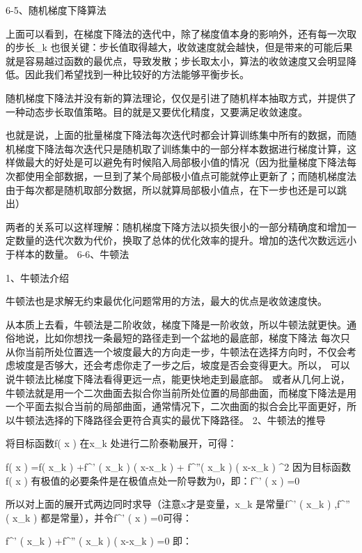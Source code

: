 \documentclass[11pt]{book}
\newcounter{#2}
\newcounter{#2}[#1]
\numberwithin{#2}{#1}
\begin{document}
6-5、随机梯度下降算法

上面可以看到，在梯度下降法的迭代中，除了梯度值本身的影响外，还有每一次取的步长\lambda _{k} 也很关键：步长值取得越大，收敛速度就会越快，但是带来的可能后果就是容易越过函数的最优点，导致发散；步长取太小，算法的收敛速度又会明显降低。因此我们希望找到一种比较好的方法能够平衡步长。

随机梯度下降法并没有新的算法理论，仅仅是引进了随机样本抽取方式，并提供了一种动态步长取值策略。目的就是又要优化精度，又要满足收敛速度。

也就是说，上面的批量梯度下降法每次迭代时都会计算训练集中所有的数据，而随机梯度下降法每次迭代只是随机取了训练集中的一部分样本数据进行梯度计算，这样做最大的好处是可以避免有时候陷入局部极小值的情况（因为批量梯度下降法每次都使用全部数据，一旦到了某个局部极小值点可能就停止更新了；而随机梯度法由于每次都是随机取部分数据，所以就算局部极小值点，在下一步也还是可以跳出）

两者的关系可以这样理解：随机梯度下降方法以损失很小的一部分精确度和增加一定数量的迭代次数为代价，换取了总体的优化效率的提升。增加的迭代次数远远小于样本的数量。
6-6、牛顿法

1、牛顿法介绍

牛顿法也是求解无约束最优化问题常用的方法，最大的优点是收敛速度快。

从本质上去看，牛顿法是二阶收敛，梯度下降是一阶收敛，所以牛顿法就更快。通俗地说，比如你想找一条最短的路径走到一个盆地的最底部，梯度下降法 每次只从你当前所处位置选一个坡度最大的方向走一步，牛顿法在选择方向时，不仅会考虑坡度是否够大，还会考虑你走了一步之后，坡度是否会变得更大。所以， 可以说牛顿法比梯度下降法看得更远一点，能更快地走到最底部。
或者从几何上说，牛顿法就是用一个二次曲面去拟合你当前所处位置的局部曲面，而梯度下降法是用一个平面去拟合当前的局部曲面，通常情况下，二次曲面的拟合会比平面更好，所以牛顿法选择的下降路径会更符合真实的最优下降路径。
2、牛顿法的推导

将目标函数f\left( x \right)  在x_{k} 处进行二阶泰勒展开，可得：

f\left( x \right) =f\left( x_{k}  \right) +f^{'} \left( x_{k}  \right) \left( x-x_{k}  \right) + f^{''}\left( x_{k}  \right)  \left( x-x_{k}  \right) ^{2} 
因为目标函数f\left( x \right) 有极值的必要条件是在极值点处一阶导数为0，即：f^{'} \left( x \right) =0

所以对上面的展开式两边同时求导（注意x才是变量，x_{k} 是常量\Rightarrow f^{'} \left( x_{k}  \right) ,f^{''} \left( x_{k}  \right) 都是常量），并令f^{'} \left( x \right) =0可得：

f^{'} \left( x_{k} \right) +f^{''} \left( x_{k} \right) \left( x-x_{k} \right) =0
即：
\end{document}

